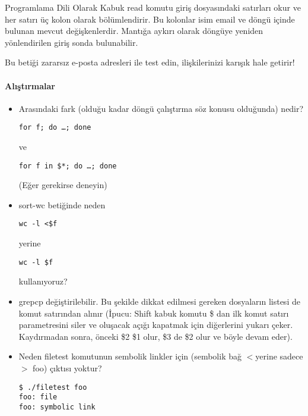 \begin{section}{Programlama Dili Olarak Kabuk}
read komutu giriş dosyasındaki satırları okur ve her satırı üç kolon olarak bölümlendirir. Bu kolonlar isim email ve döngü içinde bulunan mevcut değişkenlerdir. Mantığa aykırı olarak döngüye yeniden yönlendirilen giriş sonda bulunabilir. 

Bu betiği zararsız e-posta adresleri ile test edin, ilişkilerinizi karışık hale getirir!

\paragraph{Alıştırmalar}{
\begin{itemize}
\item Arasındaki fark (olduğu kadar döngü çalıştırma söz konusu olduğunda) nedir?
\begin{verbatim}
for f; do …; done
\end{verbatim}
ve
\begin{verbatim}
for f in $*; do …; done
\end{verbatim}
(Eğer gerekirse deneyin)
\item sort-wc betiğinde neden
\begin{verbatim}
wc -l <$f
\end{verbatim}
yerine
\begin{verbatim}
wc -l $f
\end{verbatim}
kullanıyoruz?
\item grepcp değiştirilebilir. Bu şekilde dikkat edilmesi gereken dosyaların listesi de komut satırından alınır (İpucu: Shift kabuk komutu \$ dan ilk komut satırı parametresini siler ve oluşacak açığı kapatmak için diğerlerini yukarı çeker. Kaydırmadan sonra, önceki \$2 \$1 olur, \$3 de \$2 olur ve böyle devam eder).
\item Neden filetest komutunun sembolik linkler için (sembolik bağ $<$yerine sadece$>$ foo) çıktısı yoktur?
\begin{verbatim}
$ ./filetest foo
foo: file
foo: symbolic link
\end{verbatim}
\end{itemize}
}
\end{section}

